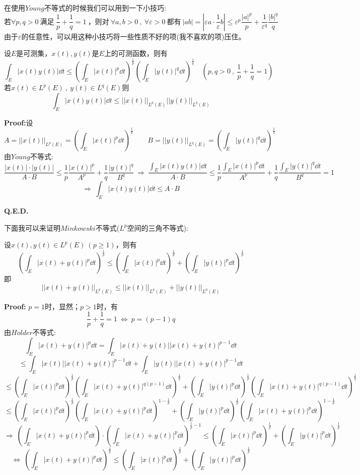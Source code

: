 在使用$Young$不等式的时候我们可以用到一下小技巧:
\[\text{若} \forall p,q>0 \ \text{满足} \ \frac{1}{p}+\frac{1}{q}=1 \ \text{，则对} \ \forall a,b>0 \ , \ \forall \varepsilon>0 \ \text{都有} \ |ab|=|\varepsilon a \cdot \frac{1}{\varepsilon}b| \leq \varepsilon^p\frac{|a|^p}{p}+\frac{1}{\varepsilon^q}\frac{|b|^q}{q}\]
由于$\varepsilon$的任意性，可以用这种小技巧将一些性质不好的项(我不喜欢的项)压住。
\begin{theorem}
    设$E$是可测集，$x(t),y(t)$是$E$上的可测函数，则有
    \[\int_E|x(t)y(t)|\dd t \leq \left(\int_E|x(t)|^p\dd t\right)^{\frac{1}{p}}\left(\int_E|y(t)|^q\dd t\right)^{\frac{1}{q}} \quad (p,q>0 \ , \ \frac{1}{p}+\frac{1}{q}=1)\]
    若$x(t) \in L^p(E) \ , \ y(t) \in L^q(E)$则
    \[\int_E|x(t)y(t)|\dd t \leq ||x(t)||_{L^p(E)}||y(t)||_{L^q(E)}\]
\end{theorem}
\textbf{Proof:}设
\[A=||x(t)||_{L^p(E)}=\left(\int_E|x(t)|^p\dd t\right)^{\frac{1}{p}} \qquad B=||y(t)||_{L^q(E)}=\left(\int_E|y(t)|^q\dd t\right)^{\frac{1}{q}}\]
由$Young$不等式:
\[\frac{|x(t)| \cdot |y(t)|}{A \cdot B} \leq \frac{1}{p}\frac{|x(t)|^p}{A^p}+\frac{1}{q}\frac{|y(t)|^q}{B^q} \ \Rightarrow \ \frac{\int_E|x(t)y(t)|\dd t}{A \cdot B} \leq \frac{1}{p}\frac{\int_E|x(t)|^p\dd t}{A^p}+\frac{1}{q}\frac{\int_E|y(t)|^q\dd t}{B^q}=1\]
\[\Rightarrow \ \int_E|x(t)y(t)|\dd t \leq A \cdot B\]

\textbf{Q.E.D.}

下面我可以来证明$Minkowski$不等式($L^p$空间的三角不等式):
\begin{theorem}
    设$x(t),y(t) \in L^p(E) \ (p \geq 1)$，则有
    \[\left(\int_E|x(t)+y(t)|^p\dd t\right)^{\frac{1}{p}} \leq \left(\int_E|x(t)|^p\dd t\right)^{\frac{1}{p}}+\left(\int_E|y(t)|^p\dd t\right)^{\frac{1}{p}}\]
    即
    \[||x(t)+y(t)||_{L^p(E)} \leq ||x(t)||_{L^p(E)}+||y(t)||_{L^p(E)}\]
\end{theorem}
\textbf{Proof:} $p=1$时，显然；$p>1$时，有
\[\frac{1}{p}+\frac{1}{q}=1 \ \Leftrightarrow \ p=(p-1)q\]
由$H\ddot{o}lder$不等式:
\[\int_E|x(t)+y(t)|^p\dd t=\int_E|x(t)+y(t)||x(t)+y(t)|^{p-1}\dd t\]
\[\leq \int_E|x(t)||x(t)+y(t)|^{p-1}\dd t+\int_E|y(t)||x(t)+y(t)|^{p-1}\dd t\]
\[\leq \left(\int_E|x(t)|^p\dd t\right)^{\frac{1}{p}}\left(\int_E|x(t)+y(t)|^{q(p-1)}\dd t\right)^{\frac{1}{q}}+\left(\int_E|y(t)|^p\dd t\right)^{\frac{1}{p}}\left(\int_E|x(t)+y(t)|^{q(p-1)}\dd t\right)^{\frac{1}{q}}\]
\[\leq \left(\int_E|x(t)|^p\dd t\right)^{\frac{1}{p}}\left(\int_E|x(t)+y(t)|^{p}\dd t\right)^{1-\frac{1}{p}}+\left(\int_E|y(t)|^p\dd t\right)^{\frac{1}{p}}\left(\int_E|x(t)+y(t)|^{p}\dd t\right)^{1-\frac{1}{p}}\]
\[\Rightarrow \ \left(\int_E|x(t)+y(t)|^p\dd t\right) \cdot \left(\int_E|x(t)+y(t)|^{p}\dd t\right)^{\frac{1}{p}-1} \leq \left(\int_E|x(t)|^p\dd t\right)^{\frac{1}{p}}+\left(\int_E|y(t)|^p\dd t\right)^{\frac{1}{p}}\]
\[\Leftrightarrow \ \left(\int_E|x(t)+y(t)|^{p}\dd t\right)^{\frac{1}{p}} \leq \left(\int_E|x(t)|^p\dd t\right)^{\frac{1}{p}}+\left(\int_E|y(t)|^p\dd t\right)^{\frac{1}{p}}\]

